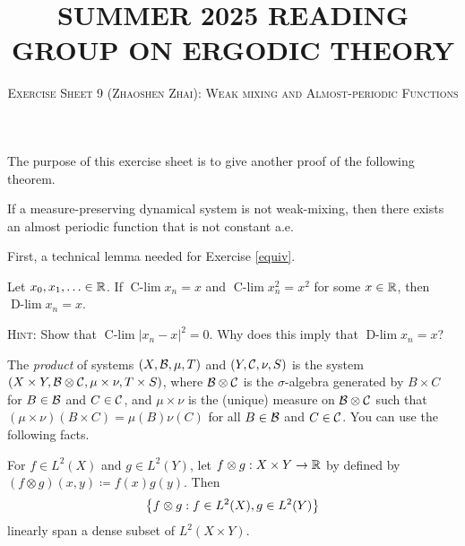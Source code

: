 \documentclass[reqno, twoside]{article}
\newcommand{\Clim}{\operatorname{C-lim}}
\newcommand{\Dlim}{\operatorname{D-lim}}
\begin{document}
    \title{\textbf{\normalsize\MakeUppercase{Summer 2025 Reading Group on Ergodic Theory}}}
    \author{\normalsize\textsc{Exercise Sheet 9 (Zhaoshen Zhai): Weak mixing and Almost-periodic Functions}}
    \date{}
    \maketitle

    The purpose of this exercise sheet is to give another proof of the following theorem.

    \begin{mainTheorem}\label{theorem}
        If a measure-preserving dynamical system is not weak-mixing, then there exists an almost periodic function that is not constant a.e.
    \end{mainTheorem}

    First, a technical lemma needed for Exercise \ref{equiv}.

    \begin{exercise}\label{tech}
        Let $x_0,x_1,\ldots\in\mathbb{R}$. If $\Clim x_n=x$ and $\Clim x_n^2=x^2$ for some $x\in\mathbb{R}$, then $\Dlim x_n=x$.

        \textsc{Hint:} Show that $\Clim|x_n-x|^2=0$. Why does this imply that $\Dlim x_n=x$?
    \end{exercise}

    The \textit{product} of systems $(X,\mathcal{B},\mu,T)$ and $(Y,\mathcal{C},\nu,S)$ is the system $(X\times Y,\mathcal{B}\otimes\mathcal{C},\mu\times\nu,T\times S)$, where $\mathcal{B}\otimes\mathcal{C}$ is the $\sigma$-algebra generated by $B\times C$ for $B\in\mathcal{B}$ and $C\in\mathcal{C}$, and $\mu\times\nu$ is the (unique) measure on $\mathcal{B}\otimes\mathcal{C}$ such that $(\mu\times\nu)(B\times C)=\mu(B)\nu(C)$ for all $B\in\mathcal{B}$ and $C\in\mathcal{C}$. You can use the following facts.

    \begin{fact*}
        For $f\in L^2(X)$ and $g\in L^2(Y)$, let $f\otimes g:X\times Y\to\mathbb{R}$ by defined by $(f\otimes g)(x,y)\coloneqq f(x)g(y)$. Then
        \vspace{-0.05in}
        \begin{equation*}
            \l\{f\otimes g\st f\in L^2(X),g\in L^2(Y)\r\}
            \vspace{-0.05in}
        \end{equation*}
        linearly span a dense subset of $L^2(X\times Y)$.
    \end{fact*}
\end{document}
